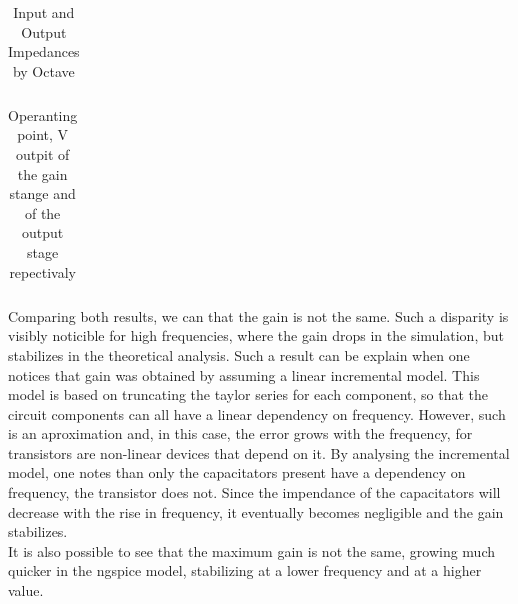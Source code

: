 %    

\FloatBarrier
\begin{table}[h]
  \centering
  \begin{tabular}{|c|c|}
    \hline    
    
    \hline
  \end{tabular}
  \caption{Input and Output Impedances by Octave}
  \label{tab:Spice1}
\end{table}
\FloatBarrier   

\FloatBarrier
\begin{table}[h]
  \centering
  \begin{tabular}{|c|c|}
    \hline    
    
    \hline
  \end{tabular}
  \caption{Operanting point, V outpit of the gain stange and of the output stage repectivaly}
  \label{tab:Spice1}
\end{table}
\FloatBarrier   


Comparing both results, we can that the gain is not the same. Such a disparity is visibly noticible for high frequencies, where the gain drops in the simulation, but stabilizes in the theoretical analysis. Such a result can be explain when one notices that gain was obtained by assuming a linear incremental model. This model is based on truncating the taylor series for each component, so that the circuit components can all have a linear dependency on frequency. However, such is an aproximation and, in this case, the error grows with the frequency, for transistors are non-linear devices that depend on it. By analysing the incremental model, one notes than only the capacitators present have a dependency on frequency, the transistor does not. Since the impendance of the capacitators will decrease with the rise in frequency, it eventually becomes negligible and the gain stabilizes.\\
It is also possible to see that the maximum gain is not the same, growing much quicker in the ngspice model, stabilizing at a lower frequency and at a higher value.\\





